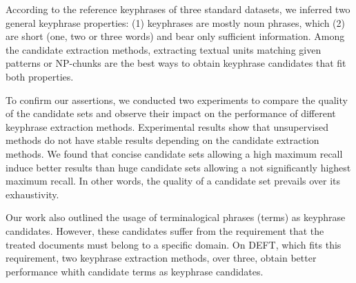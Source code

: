   According to the reference keyphrases of three standard datasets, we inferred
  two general keyphrase properties: (1) keyphrases are mostly noun phrases,
  which (2) are short (one, two or three words) and bear only sufficient
  information. Among the candidate extraction methods, extracting textual units
  matching given patterns or NP-chunks are the best ways to obtain keyphrase
  candidates that fit both properties.

  To confirm our assertions, we conducted two experiments to compare the quality
  of the candidate sets and observe their impact on
  the performance of different keyphrase extraction methods. Experimental
  results show that unsupervised methods do not have stable results depending on
  the candidate extraction methods. We found that concise candidate sets
  allowing a high maximum recall induce better results than huge candidate sets
  allowing a not significantly highest maximum recall. In other words, the
  quality of a candidate set prevails over its exhaustivity.

  Our work also outlined the usage of terminalogical phrases (terms) as
  keyphrase candidates. However, these candidates suffer from the requirement
  that the treated documents must belong to a specific domain. On DEFT, which
  fits this requirement, two keyphrase extraction methods, over three, obtain
  better performance whith candidate terms as keyphrase candidates.


